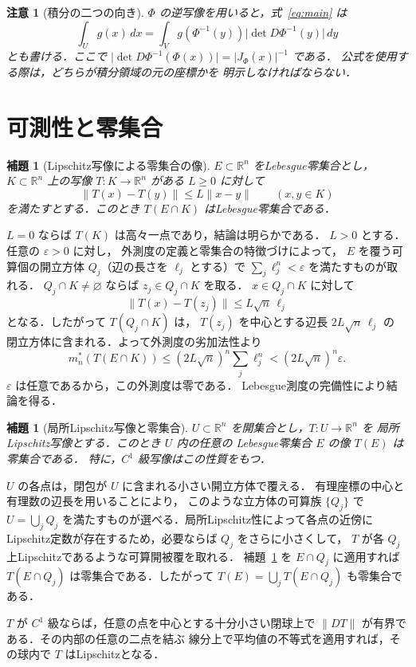 \documentclass[a5paper,10pt,onecolumn]{jsarticle}
\makeatletter
\theoremstyle{mathnotetheorem}
\newtheorem{lemma}[theorem]{補題}
\newtheorem{remark}[theorem]{注意}
\renewcommand{\proofname}{証明}
\renewenvironment{proof}[1][\proofname]{%
  \par\pushQED{\qed}\normalfont\topsep4\p@\@plus2\p@\relax
  \trivlist\item[\hskip\labelsep\bfseries #1]\ignorespaces
}{\popQED\endtrivlist\@endpefalse}
\newcommand{\R}{\mathbb{R}}
\newcommand{\norm}[1]{\lVert #1\rVert}
\newcommand{\abs}[1]{\lvert #1\rvert}
\makeatother
\begin{document}
\begin{remark}[積分の二つの向き]
$\Phi$ の逆写像を用いると，式~\eqref{eq:main} は
\[
 \int_U g(x)\,dx
 =\int_V g(\Phi^{-1}(y))
 \abs{\det D\Phi^{-1}(y)}\,dy
\]
とも書ける．ここで
$\abs{\det D\Phi^{-1}(\Phi(x))}
 =\abs{J_\Phi(x)}^{-1}$ である．
公式を使用する際は，どちらが積分領域の元の座標かを
明示しなければならない．
\end{remark}

\section{可測性と零集合}

\begin{lemma}[Lipschitz写像による零集合の像]\label{lem:lipschitz-null}
$E\subset\R^n$ をLebesgue零集合とし，$K\subset\R^n$ 上の写像
$T:K\to\R^n$ がある $L\ge0$ に対して
\[
 \norm{T(x)-T(y)}\le L\norm{x-y}
 \qquad(x,y\in K)
\]
を満たすとする．このとき $T(E\cap K)$ はLebesgue零集合である．
\end{lemma}

\begin{proof}
$L=0$ ならば $T(K)$ は高々一点であり，結論は明らかである．
$L>0$ とする．任意の $\varepsilon>0$ に対し，
外測度の定義と零集合の特徴づけによって，
$E$ を覆う可算個の開立方体
$Q_j$（辺の長さを $\ell_j$ とする）で
$\sum_j\ell_j^n<\varepsilon$ を満たすものが取れる．
$Q_j\cap K\ne\varnothing$ ならば $z_j\in Q_j\cap K$ を取る．
$x\in Q_j\cap K$ に対して
\[
 \norm{T(x)-T(z_j)}\le L\sqrt n\,\ell_j
\]
となる．したがって $T(Q_j\cap K)$ は，
$T(z_j)$ を中心とする辺長 $2L\sqrt n\,\ell_j$ の
閉立方体に含まれる．よって外測度の劣加法性より
\[
 m_n^*(T(E\cap K))
 \le (2L\sqrt n)^n\sum_j\ell_j^n
 <(2L\sqrt n)^n\varepsilon.
\]
$\varepsilon$ は任意であるから，この外測度は零である．
Lebesgue測度の完備性により結論を得る．
\end{proof}

\begin{lemma}[局所Lipschitz写像と零集合]\label{lem:local-lip}
$U\subset\R^n$ を開集合とし，$T:U\to\R^n$ を
局所Lipschitz写像とする．このとき $U$ 内の任意の
Lebesgue零集合 $E$ の像 $T(E)$ は零集合である．
特に，$C^1$ 級写像はこの性質をもつ．
\end{lemma}

\begin{proof}
$U$ の各点は，閉包が $U$ に含まれる小さい開立方体で覆える．
有理座標の中心と有理数の辺長を用いることにより，
このような立方体の可算族 $\{Q_j\}$ で $U=\bigcup_j Q_j$
を満たすものが選べる．局所Lipschitz性によって各点の近傍に
Lipschitz定数が存在するため，必要ならば $Q_j$ をさらに小さくして，
$T$ が各 $Q_j$ 上Lipschitzであるような可算開被覆を取れる．
補題~\ref{lem:lipschitz-null} を $E\cap Q_j$ に適用すれば
$T(E\cap Q_j)$ は零集合である．したがって
$T(E)=\bigcup_j T(E\cap Q_j)$ も零集合である．

$T$ が $C^1$ 級ならば，任意の点を中心とする十分小さい閉球上で
$\norm{DT}$ が有界である．その内部の任意の二点を結ぶ
線分上で平均値の不等式を適用すれば，その球内で
$T$ はLipschitzとなる．
\end{proof}
\end{document}
